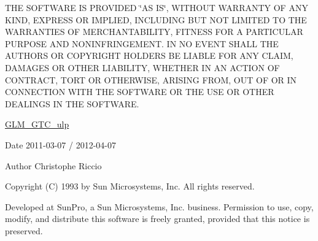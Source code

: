 T\-H\-E S\-O\-F\-T\-W\-A\-R\-E I\-S P\-R\-O\-V\-I\-D\-E\-D \char`\"{}\-A\-S I\-S\char`\"{}, W\-I\-T\-H\-O\-U\-T W\-A\-R\-R\-A\-N\-T\-Y O\-F A\-N\-Y K\-I\-N\-D, E\-X\-P\-R\-E\-S\-S O\-R I\-M\-P\-L\-I\-E\-D, I\-N\-C\-L\-U\-D\-I\-N\-G B\-U\-T N\-O\-T L\-I\-M\-I\-T\-E\-D T\-O T\-H\-E W\-A\-R\-R\-A\-N\-T\-I\-E\-S O\-F M\-E\-R\-C\-H\-A\-N\-T\-A\-B\-I\-L\-I\-T\-Y, F\-I\-T\-N\-E\-S\-S F\-O\-R A P\-A\-R\-T\-I\-C\-U\-L\-A\-R P\-U\-R\-P\-O\-S\-E A\-N\-D N\-O\-N\-I\-N\-F\-R\-I\-N\-G\-E\-M\-E\-N\-T. I\-N N\-O E\-V\-E\-N\-T S\-H\-A\-L\-L T\-H\-E A\-U\-T\-H\-O\-R\-S O\-R C\-O\-P\-Y\-R\-I\-G\-H\-T H\-O\-L\-D\-E\-R\-S B\-E L\-I\-A\-B\-L\-E F\-O\-R A\-N\-Y C\-L\-A\-I\-M, D\-A\-M\-A\-G\-E\-S O\-R O\-T\-H\-E\-R L\-I\-A\-B\-I\-L\-I\-T\-Y, W\-H\-E\-T\-H\-E\-R I\-N A\-N A\-C\-T\-I\-O\-N O\-F C\-O\-N\-T\-R\-A\-C\-T, T\-O\-R\-T O\-R O\-T\-H\-E\-R\-W\-I\-S\-E, A\-R\-I\-S\-I\-N\-G F\-R\-O\-M, O\-U\-T O\-F O\-R I\-N C\-O\-N\-N\-E\-C\-T\-I\-O\-N W\-I\-T\-H T\-H\-E S\-O\-F\-T\-W\-A\-R\-E O\-R T\-H\-E U\-S\-E O\-R O\-T\-H\-E\-R D\-E\-A\-L\-I\-N\-G\-S I\-N T\-H\-E S\-O\-F\-T\-W\-A\-R\-E.

\hyperlink{group__gtc__ulp}{G\-L\-M\-\_\-\-G\-T\-C\-\_\-ulp}

\begin{DoxyDate}{Date}
2011-\/03-\/07 / 2012-\/04-\/07 
\end{DoxyDate}
\begin{DoxyAuthor}{Author}
Christophe Riccio
\end{DoxyAuthor}
Copyright (C) 1993 by Sun Microsystems, Inc. All rights reserved.

Developed at Sun\-Pro, a Sun Microsystems, Inc. business. Permission to use, copy, modify, and distribute this software is freely granted, provided that this notice is preserved. 

